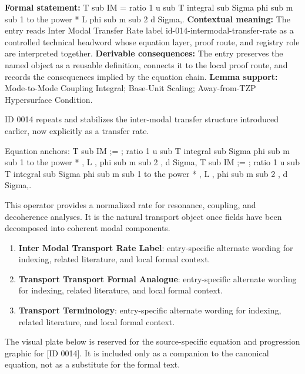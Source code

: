 \begingroup\footnotesize\setlength{\emergencystretch}{3em}\sloppy
\textbf{Formal statement:} T sub IM = ratio 1 u sub T integral sub Sigma phi sub m sub 1 to the power * L phi sub m sub 2 d Sigma,. \textbf{Contextual meaning:} The entry reads Inter Modal Transfer Rate label id-014-intermodal-transfer-rate as a controlled technical headword whose equation layer, proof route, and registry role are interpreted together. \textbf{Derivable consequences:} The entry preserves the named object as a reusable definition, connects it to the local proof route, and records the consequences implied by the equation chain. \textbf{Lemma support:} Mode-to-Mode Coupling Integral; Base-Unit Scaling; Away-from-TZP Hypersurface Condition.\par
\endgroup

ID 0014 repeats and stabilizes the inter-modal transfer structure introduced earlier, now explicitly as a transfer rate.

Equation anchors: T sub IM ;= ; ratio 1 u sub T integral sub Sigma phi sub m sub 1 to the power * , L , phi sub m sub 2 , d Sigma, T sub IM ;= ; ratio 1 u sub T integral sub Sigma phi sub m sub 1 to the power * , L , phi sub m sub 2 , d Sigma,.

This operator provides a normalized rate for resonance, coupling, and decoherence analyses. It is the natural transport object once fields have been decomposed into coherent modal components.
\endgroup

\begingroup\footnotesize\sloppy
\begin{enumerate}[leftmargin=1.35em,itemsep=1pt,topsep=1pt,parsep=0pt]
\item \textbf{Inter Modal Transport Rate Label}: entry-specific alternate wording for indexing, related literature, and local formal context.
\item \textbf{Transport Transport Formal Analogue}: entry-specific alternate wording for indexing, related literature, and local formal context.
\item \textbf{Transport Terminology}: entry-specific alternate wording for indexing, related literature, and local formal context.
\end{enumerate}
\endgroup

\begingroup\footnotesize\sloppy
The visual plate below is reserved for the source-specific equation and progression graphic for [ID 0014]. It is included only as a companion to the canonical equation, not as a substitute for the formal text.
\par\endgroup
\ifTZPDarkEdition
{}
\fi

